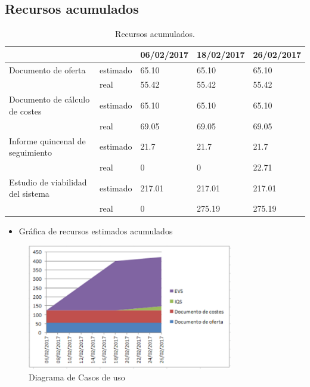 \subsection{Recursos acumulados}

\begin{table}[H]
\begin{center}
\begin{tabular}{ l | l | l |l | l }
\hline
	 &  & 06/02/2017 & 18/02/2017 & 26/02/2017 \\ \hline
	Documento de oferta & estimado & 65.10 & 65.10 & 65.10 \\
	 & real & 55.42 & 55.42 & 55.42 \\ \hline
	Documento de cálculo de costes & estimado & 65.10 & 65.10 & 65.10 \\
	 & real & 69.05 & 69.05 & 69.05 \\ \hline
	Informe quincenal de seguimiento & estimado & 21.7 & 21.7 & 21.7 \\
	 & real & 0 & 0 & 22.71 \\ \hline
	Estudio de viabilidad del sistema & estimado & 217.01 & 217.01 & 217.01 \\
	 & real & 0 & 275.19 & 275.19 \\ \hline
\end{tabular}
\caption{Recursos acumulados.}
\label{tab:Recursos acumulados}
\end{center}
\end{table}
\pagebreak
\begin{itemize}
\item Gráfica de recursos estimados acumulados
\end{itemize}

\begin{figure}[H]
\begin{center}
\includegraphics[width=0.8\textwidth]{./img/RecursosEstimados.png}
\end{center}
\caption{Diagrama de Casos de uso}
\label{tab:dcufinal}
\end{figure}


